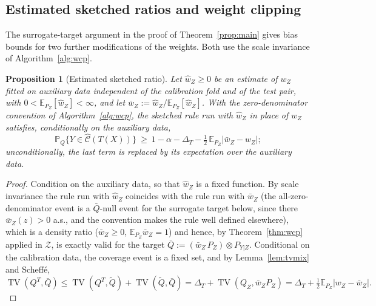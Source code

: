 \documentclass[11pt,a4paper]{article}
\newcommand{\abs}[1]{\left|#1\right|}
\newcommand{\E}{\mathbb{E}}
\newcommand{\Prob}{\mathbb{P}}
\newcommand{\TV}{\operatorname{TV}}
\newcommand{\Cset}{\widehat{\mathcal C}}
\newcommand{\Zc}{\mathcal Z}
\newcommand{\Qt}{\widetilde Q}
\theoremstyle{plain}
\newtheorem{proposition}[theorem]{Proposition}
\theoremstyle{definition}
\theoremstyle{remark}
\begin{document}
\subsection{Estimated sketched ratios and weight clipping}

The surrogate-target argument in the proof of Theorem~\ref{prop:main} gives bias bounds for two further modifications of the weights. Both use the scale invariance of Algorithm~\ref{alg:wcp}.

\begin{proposition}[Estimated sketched ratio]\label{prop:est}
Let $\hat w_Z\ge0$ be an estimate of $w_Z$ fitted on auxiliary data independent of the calibration fold and of the test pair, with $0<\E_{P_Z}[\hat w_Z]<\infty$, and let $\bar w_Z:=\hat w_Z/\E_{P_Z}[\hat w_Z]$. With the zero-denominator convention of Algorithm~\ref{alg:wcp}, the sketched rule run with $\hat w_Z$ in place of $w_Z$ satisfies, conditionally on the auxiliary data,
\[
\Prob_Q\bigl\{Y\in\Cset(T(X))\bigr\}\ \ge\ 1-\alpha-\Delta_T-\tfrac12\,\E_{P_Z}\abs{\bar w_Z-w_Z} ;
\]
unconditionally, the last term is replaced by its expectation over the auxiliary data.
\end{proposition}
\begin{proof}
Condition on the auxiliary data, so that $\hat w_Z$ is a fixed function. By scale invariance the rule run with $\hat w_Z$ coincides with the rule run with $\bar w_Z$ (the all-zero-denominator event is a $\bar Q$-null event for the surrogate target below, since there $\bar w_Z(z)>0$ a.s., and the convention makes the rule well defined elsewhere), which is a density ratio ($\bar w_Z\ge0$, $\E_{P_Z}\bar w_Z=1$) and hence, by Theorem~\ref{thm:wcp} applied in $\Zc$, is exactly valid for the target $\bar Q:=(\bar w_Z\,P_Z)\otimes P_{Y|Z}$. Conditional on the calibration data, the coverage event is a fixed set, and by Lemma~\ref{lem:tvmix} and Scheff\'e,
\[
\TV(Q^T,\bar Q)\le\TV(Q^T,\Qt)+\TV(\Qt,\bar Q)=\Delta_T+\TV(Q_Z,\bar w_ZP_Z)=\Delta_T+\tfrac12\E_{P_Z}|w_Z-\bar w_Z|.
\]
\end{proof}
\end{document}
